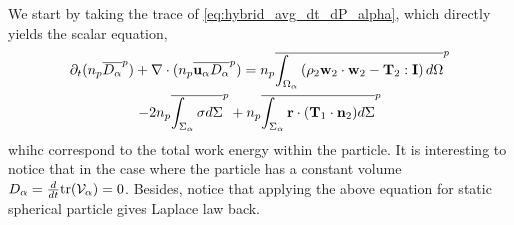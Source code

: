 We start by taking the trace of \ref{eq:hybrid_avg_dt_dP_alpha}, which directly yields the scalar equation, 
\begin{multline}
    \partial_t (n_p\overline{D_\alpha}^{p})
    + \mathbf{\nabla}\cdot (n_p\overline{  \textbf{u}_\alpha D_\alpha}^{p})
    = n_p\overline{\int_{\Omega_\alpha} \left(
        \rho_2 \textbf{w}_2 \cdot \textbf{w}_2
        - \mathbf{T}_2 : \textbf{I}
        \right) d\Omega}^{p}\\
        - 2n_p\overline{\int_{\Sigma_\alpha} \sigma d\Sigma}^{p}
        + n_p\overline{\int_{\Sigma_\alpha} \textbf{r}\cdot(\textbf{T}_1\cdot\textbf{n}_2) d\Sigma}^{p}
    \label{eq:hybrid_avg_dt_dD_alpha}
\end{multline}
whihc correspond to the total work energy within the particle. 
It is interesting to notice that in the case where the particle has a constant volume $D_\alpha = \frac{d}{d t} \text{tr}(\mathcal{V}_\alpha)  = 0$. 
Besides, notice that applying the above equation for static spherical particle gives Laplace law back. 



